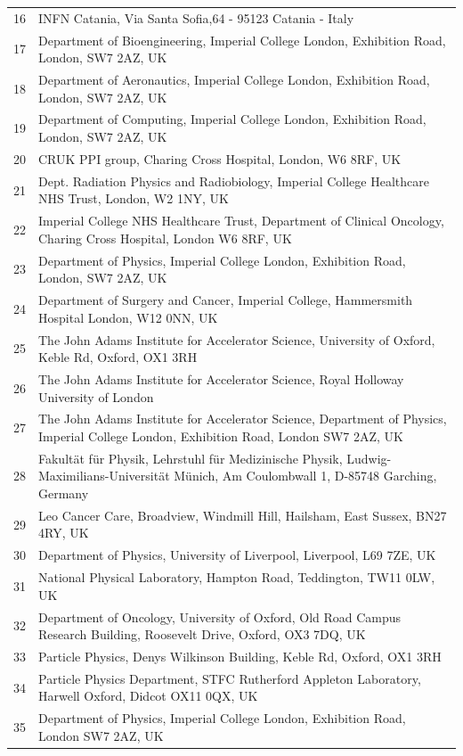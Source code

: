 {\begin{tabular}{ c p{15cm} }
     16 & INFN Catania, Via Santa Sofia,64 - 95123 Catania - Italy\\
     17 & Department of Bioengineering, Imperial College London, Exhibition Road, London, SW7 2AZ, UK\\
     18 & Department of Aeronautics, Imperial College London, Exhibition Road, London, SW7 2AZ, UK\\
     19 & Department of Computing, Imperial College London, Exhibition Road, London, SW7 2AZ, UK\\
     20 & CRUK PPI group, Charing Cross Hospital, London, W6 8RF, UK\\
     21 & Dept. Radiation Physics and Radiobiology, Imperial College Healthcare NHS Trust, London, W2 1NY, UK\\
     22 & Imperial College NHS Healthcare Trust, Department of Clinical Oncology, Charing Cross Hospital, London W6 8RF, UK\\
     23 & Department of Physics, Imperial College London, Exhibition Road, London, SW7 2AZ, UK\\
     24 & Department of Surgery and Cancer, Imperial College, Hammersmith Hospital London, W12 0NN, UK\\
     25 & The John Adams Institute for Accelerator Science, University of Oxford, Keble Rd, Oxford, OX1 3RH\\
     26 & The John Adams Institute for Accelerator Science, Royal Holloway University of London\\
     27 & The John Adams Institute for Accelerator Science, Department of Physics, Imperial College London, Exhibition Road, London SW7 2AZ, UK\\
     28 & Fakult\"at f\"ur Physik, Lehrstuhl f\"ur Medizinische Physik, Ludwig-Maximilians-Universit\"at M\"unich, Am Coulombwall 1, D-85748 Garching, Germany\\
     29 & Leo Cancer Care, Broadview, Windmill Hill, Hailsham, East Sussex, BN27 4RY, UK\\
     30 & Department of Physics, University of Liverpool, Liverpool, L69 7ZE, UK\\
     31 & National Physical Laboratory, Hampton Road, Teddington, TW11 0LW, UK\\
     32 & Department of Oncology, University of Oxford, Old Road Campus Research Building, Roosevelt Drive, Oxford, OX3 7DQ, UK\\
     33 & Particle Physics, Denys Wilkinson Building, Keble Rd, Oxford, OX1 3RH\\
     34 & Particle Physics Department, STFC Rutherford Appleton Laboratory, Harwell Oxford, Didcot OX11 0QX, UK\\
     35 & Department of Physics, Imperial College London, Exhibition Road, London SW7 2AZ, UK\\
  \end{tabular}
}
 
